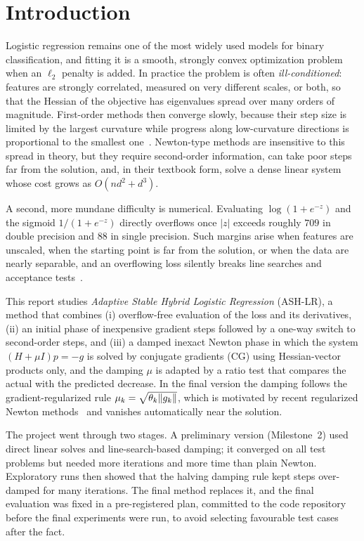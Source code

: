 \section{Introduction}\label{sec:intro}

Logistic regression remains one of the most widely used models for binary
classification, and fitting it is a smooth, strongly convex optimization problem
when an $\ell_2$ penalty is added. In practice the problem is often
\emph{ill-conditioned}: features are strongly correlated, measured on very different
scales, or both, so that the Hessian of the objective has eigenvalues spread over
many orders of magnitude. First-order methods then converge slowly, because their
step size is limited by the largest curvature while progress along low-curvature
directions is proportional to the smallest one~\cite{wright2022optimization,berahas2020investigation}.
Newton-type methods are insensitive to this spread in theory, but they require
second-order information, can take poor steps far from the solution, and, in their
textbook form, solve a dense linear system whose cost grows as $O(nd^2+d^3)$.

A second, more mundane difficulty is numerical. Evaluating
$\log(1+e^{-z})$ and the sigmoid $1/(1+e^{-z})$ directly overflows once $|z|$
exceeds roughly $709$ in double precision and $88$ in single precision. Such
margins arise when features are unscaled, when the starting point is far from the
solution, or when the data are nearly separable, and an overflowing loss silently
breaks line searches and acceptance tests~\cite{blanchard2021accurately,wiemann2024softplus}.

This report studies \emph{Adaptive Stable Hybrid Logistic Regression} (ASH-LR), a
method that combines (i) overflow-free evaluation of the loss and its derivatives,
(ii) an initial phase of inexpensive gradient steps followed by a one-way switch to
second-order steps, and (iii) a damped inexact Newton phase in which the system
$(H+\mu I)p=-g$ is solved by conjugate gradients (CG) using Hessian-vector
products only, and the damping $\mu$ is adapted by a ratio test that compares the
actual with the predicted decrease. In the final version the damping follows the
gradient-regularized rule $\mu_k=\sqrt{\theta_k\lVert g_k\rVert}$, which is motivated by
recent regularized Newton methods~\cite{mishchenko2023regularized,doikov2024super}
and vanishes automatically near the solution.

The project went through two stages. A preliminary version (Milestone~2) used
direct linear solves and line-search-based damping; it converged on all test
problems but needed more iterations and more time than plain Newton. Exploratory
runs then showed that the halving damping rule kept steps over-damped for many
iterations. The final method replaces it, and the final evaluation was fixed in a
pre-registered plan, committed to the code repository before the final experiments
were run, to avoid selecting favourable test cases after the fact.

